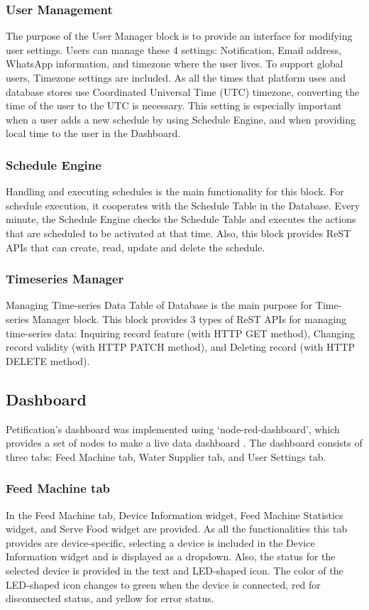 \documentclass[conference]{IEEEtran}
\begin{document}
\subsubsection{User Management}
The purpose of the User Manager block is to provide an interface for modifying user settings. Users can manage these 4 settings: Notification, Email address, WhatsApp information, and timezone where the user lives.  To support global users, Timezone settings are included. As all the times that platform uses and database stores use Coordinated Universal Time (UTC) timezone, converting the time of the user to the UTC is necessary. This setting is especially important when a user adds a new schedule by using Schedule Engine, and when providing local time to the user in the Dashboard.

\subsubsection{Schedule Engine}
Handling and executing schedules is the main functionality for this block. For schedule execution, it cooperates with the Schedule Table in the Database. Every minute, the Schedule Engine checks the Schedule Table and executes the actions that are scheduled to be activated at that time. Also, this block provides ReST APIs that can create, read, update and delete the schedule.

\subsubsection{Timeseries Manager}
Managing Time-series Data Table of Database is the main purpose for Time-series Manager block. This block provides 3 types of ReST APIs for managing time-series data: Inquiring record feature (with HTTP GET method), Changing record validity (with HTTP PATCH method), and Deleting record (with HTTP DELETE method).

\subsection{Dashboard}
Petification’s dashboard was implemented using ‘node-red-dashboard’, which provides a set of nodes to make a live data dashboard \cite{b23}.
The dashboard consists of three tabs: Feed Machine tab, Water Supplier tab, and User Settings tab.

\subsubsection{Feed Machine tab}
In the Feed Machine tab, Device Information widget, Feed Machine Statistics widget, and Serve Food widget are provided. As all the functionalities this tab provides are device-specific, selecting a device is included in the Device Information widget and is displayed as a dropdown.
Also, the status for the selected device is provided in the text and LED-shaped icon. The color of the LED-shaped icon changes to green when the device is connected, red for disconnected status, and yellow for error status.
\end{document}
